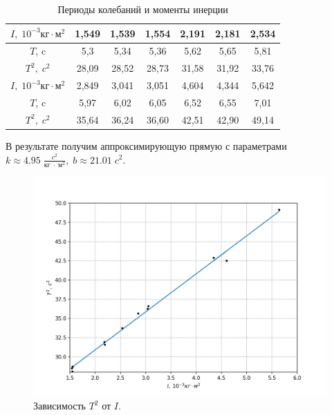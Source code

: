 \documentclass[a4paper, 12pt]{article}
\begin{document}
        \begin{table}[ht]
            \centering
            \caption{Периоды колебаний и моменты инерции}
            \begin{tabular}{|c|c|c|c|c|c|c|}
                \hline
                $I,\;10^{-3} кг\cdot м^2$
                & 1,549 & 1,539 & 1,554 
                & 2,191 & 2,181 & 2,534 \\ 
                \hline
                $T$, c
                & 5,3   & 5,34  & 5,36  
                & 5,62  & 5,65  & 5,81  \\ 
                \hline
                $T^2,\;c^2$
                & 28,09 & 28,52 & 28,73 
                & 31,58 & 31,92 & 33,76 \\ 
                \hline
                \hline
                $I,\;10^{-3} кг\cdot м^2$
                & 2,849 & 3,041 & 3,051 
                & 4,604 & 4,344 & 5,642 \\ 
                \hline
                $T$, c
                & 5,97  & 6,02  & 6,05  
                & 6,52  & 6,55  & 7,01  \\ 
                \hline
                $T^2,\;c^2$
                & 35,64 & 36,24 & 36,60 
                & 42,51 & 42,90 & 49,14 \\ 
                \hline
            \end{tabular}
        \end{table}

        В результате получим аппроксимирующую прямую с параметрами $k \approx 4.95\;\frac{c^2}{кг \;\cdot \; м^2},\; b \approx 21.01\; c^2$.
        
        \begin{figure}[ht]
            \begin{center}
                \includegraphics[width=1\textwidth]{T_2_from_I}
                \caption*{Зависимость $T^2$ от $I$.}
            \end{center}
        \end{figure}
                    
\end{document}

